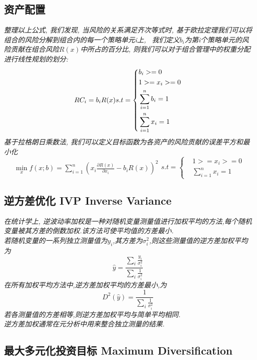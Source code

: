 \documentclass{scrartcl}
\numberwithin{equation}{section}   %
\begin{document}
\subsection{资产配置}
\textsl{整理以上公式, 我们发现, 当风险的关系满足齐次等式时, 基于欧拉定理我们可以将组合的风险分解到组合内的每一个策略单元i上, \
    我们定义$b_i$为第i个策略单元的风险贡献在组合风险$R(x)$中所占的百分比, 则我们可以对于组合管理中的权重分配进行线性规划的划分:}
$$
    RC_i = b_i R(x) \\
    s.t =\left\{
    \begin{aligned}
         & b_i  >=  0             \\
         & 1  >= x_i >=  0        \\
         & \sum_{i=1}^n{b_i}  = 1 \\
         & \sum_{i=1}^n{x_i}  = 1 \\
    \end{aligned}
    \right.
$$
\textsl{基于拉格朗日乘数法, 我们可以定义目标函数为各资产的风险贡献的误差平方和最小化}
\begin{equation}
    \begin{aligned}
        \min_x f(x;b) = \sum_{i=1}^n (x_i \frac {\partial R(x)}{\partial x_i} - b_i R(x))^2
    \end{aligned}
    s.t =\left\{
    \begin{aligned}
         & 1  >= x_i >=  0          \\
         & \sum_{i=1}^n{x_i}   =  1
    \end{aligned}
    \right.
\end{equation}

\subsection{逆方差优化 IVP Inverse Variance}
\textsl{在统计学上, 逆波动率加权是一种对随机变量测量值进行加权平均的方法,每个随机变量被其方差的倒数加权.该方法可使平均值的方差最小.\\若随机变量的一系列独立测量值为$y_i$,其方差为$\sigma_i^2$,则这些测量值的逆方差加权平均为$$\hat{y} =\frac{\sum_i{\frac{y_i}{\sigma_i^2}}}{\sum_i{\frac{1}{\sigma_i^2}}}$$在所有加权平均方法中,逆方差加权平均的方差最小,为$$D^2(\hat{y}) =\frac{1}{\sum_i{\frac{1}{\sigma_i^2}}}$$若各测量值的方差相等,则逆方差加权平均与简单平均相同.\\逆方差加权通常在元分析中用来整合独立测量的结果.
}

\subsection{最大多元化投资目标 Maximum Diversification}
\end{document}
